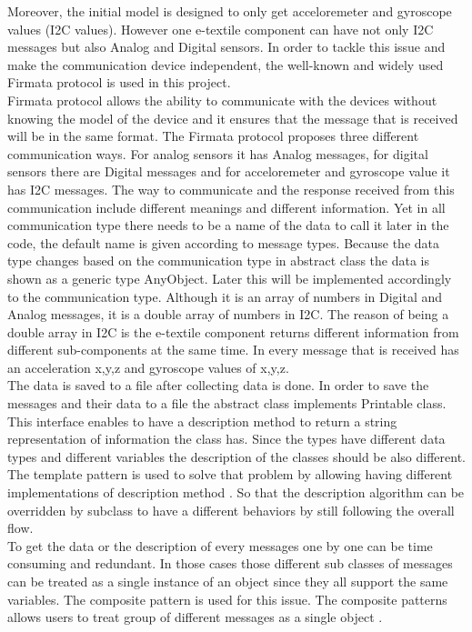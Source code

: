Moreover, the initial model is designed to only get acceloremeter and gyroscope values (I2C values). However one e-textile component can have not only I2C messages but also Analog and Digital sensors. In order to tackle this issue and make the communication device independent, the well-known and widely used Firmata protocol is used in this project.\\

Firmata protocol allows the ability to communicate with the devices without knowing the model of the device and it ensures that the message that is received will be in the same format. The Firmata protocol proposes three different communication ways. For analog sensors it has Analog messages, for digital sensors there are Digital messages and for acceloremeter and gyroscope value it has I2C messages. The way to communicate and the response received from this communication include different meanings and different information. Yet in all communication type there needs to be a name of the data to call it later in the code, the default name is given according to message types. Because the data type changes based on the communication type in abstract class the data is shown as a generic type AnyObject. Later this will be implemented accordingly to the communication type. Although it is an array of numbers in Digital and Analog messages, it is a double array of numbers in I2C. The reason of being a double array in I2C is the e-textile component returns different information from different sub-components at the same time. In every message that is received has an acceleration x,y,z and gyroscope values of x,y,z. \\

The data is saved to a file after collecting data is done. In order to save the messages and their data to a file the abstract class implements Printable class. This interface enables to have a description method to return a string representation of information the class has. Since the types have different data types and different variables the description of the classes should be also different. The template pattern is used to solve that problem by allowing having different implementations of description method \cite{GoF}. So that the description algorithm can be overridden by subclass to have a different behaviors by still following the overall flow. \\

To get the data or the description of every messages one by one can be time consuming and redundant. In those cases those different sub classes of messages can be treated as a single instance of an object since they all support the same variables. The composite pattern is used for this issue. The composite patterns allows users to treat group of different messages as a single object \cite{GoF}. \\
	
